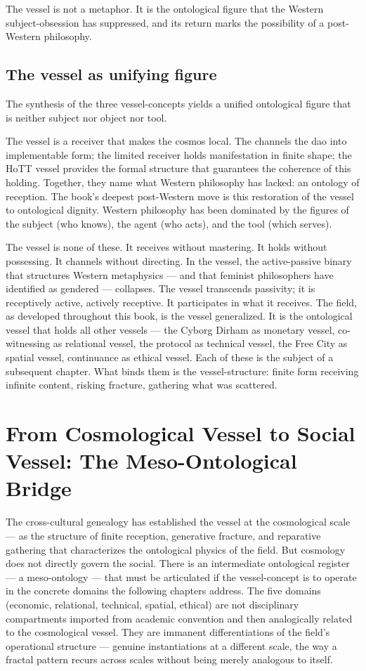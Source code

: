 The vessel is not a metaphor. It is the ontological figure that the Western subject-obsession has suppressed, and its return marks the possibility of a post-Western philosophy.

\subsection{The vessel as unifying figure}

The synthesis of the three vessel-concepts yields a unified ontological figure that is neither subject nor object nor tool.

The vessel is a receiver that makes the cosmos local. The  channels the dao into implementable form; the limited receiver holds manifestation in finite shape; the HoTT vessel provides the formal structure that guarantees the coherence of this holding. Together, they name what Western philosophy has lacked: an ontology of reception. The book's deepest post-Western move is this restoration of the vessel to ontological dignity. Western philosophy has been dominated by the figures of the subject (who knows), the agent (who acts), and the tool (which serves).

The vessel is none of these. It receives without mastering. It holds without possessing. It channels without directing. In the vessel, the active-passive binary that structures Western metaphysics — and that feminist philosophers have identified as gendered — collapses. The vessel transcends passivity; it is receptively active, actively receptive. It participates in what it receives. The field, as developed throughout this book, is the vessel generalized. It is the ontological vessel that holds all other vessels — the Cyborg Dirham as monetary vessel, co-witnessing as relational vessel, the  protocol as technical vessel, the Free City as spatial vessel, continuance as ethical vessel. Each of these is the subject of a subsequent chapter. What binds them is the vessel-structure: finite form receiving infinite content, risking fracture, gathering what was scattered.

\section{From Cosmological Vessel to Social Vessel: The Meso-Ontological Bridge}

The cross-cultural genealogy has established the vessel at the cosmological scale — as the structure of finite reception, generative fracture, and reparative gathering that characterizes the ontological physics of the field. But cosmology does not directly govern the social. There is an intermediate ontological register — a meso-ontology — that must be articulated if the vessel-concept is to operate in the concrete domains the following chapters address. The five domains (economic, relational, technical, spatial, ethical) are not disciplinary compartments imported from academic convention and then analogically related to the cosmological vessel. They are immanent differentiations of the field's operational structure — genuine instantiations at a different scale, the way a fractal pattern recurs across scales without being merely analogous to itself.

